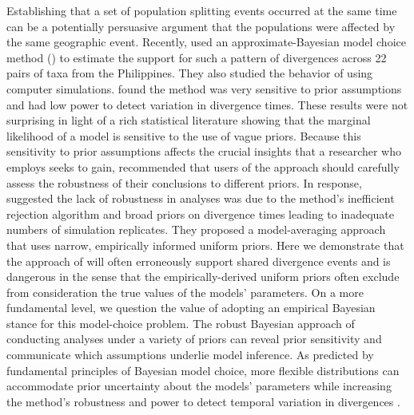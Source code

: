 Establishing that a set of population splitting events occurred at the same
time can be a potentially persuasive argument that the populations were
affected by the same geographic event.
Recently, \citet{Oaks2012} used an approximate-Bayesian model choice method
(\msb) to estimate the support for such a pattern of divergences across 22
pairs of taxa from the Philippines.
They also studied the behavior of \msb using computer simulations.
\citet{Oaks2012} found the method was very sensitive to prior assumptions and
had low power to detect variation in divergence times.
These results were not surprising in light of a rich statistical literature
showing that the marginal likelihood of a model is sensitive to the
use of vague priors.
Because this sensitivity to prior assumptions affects the crucial insights that
a researcher who employs \msb seeks to gain, \citet{Oaks2012} recommended that
users of the approach should carefully assess the robustness of their
conclusions to different priors.
In response, \citet{Hickerson2013} suggested the lack of robustness in \msb
analyses was due to the method's inefficient rejection algorithm and broad
priors on divergence times leading to inadequate numbers of simulation
replicates.
They proposed a model-averaging approach that uses narrow, empirically
informed uniform priors.
Here we demonstrate that the approach of \citet{Hickerson2013} will often
erroneously support shared divergence events and is dangerous in the sense that
the empirically-derived uniform priors often exclude from consideration the
true values of the models' parameters.
On a more fundamental level, we question the value of adopting an empirical
Bayesian stance for this model-choice problem.
The robust Bayesian approach of conducting analyses under a variety of priors
can reveal prior sensitivity and communicate which assumptions underlie model
inference.
As predicted by fundamental principles of Bayesian model choice, more flexible
distributions can accommodate prior uncertainty about the models' parameters
while increasing the method's robustness and power to detect temporal variation
in divergences \citep{Oaks2014dpp}.
